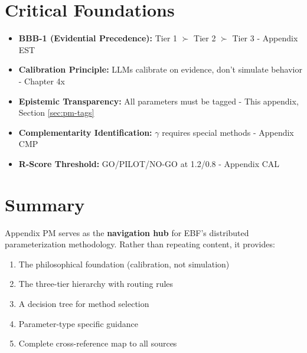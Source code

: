 
\section{Critical Foundations}
\label{sec:pm-foundations}

\begin{itemize}
    \item \textbf{BBB-1 (Evidential Precedence):} Tier 1 $\succ$ Tier 2 $\succ$ Tier 3 - Appendix EST
    \item \textbf{Calibration Principle:} LLMs calibrate on evidence, don't simulate behavior - Chapter 4x
    \item \textbf{Epistemic Transparency:} All parameters must be tagged - This appendix, Section \ref{sec:pm-tags}
    \item \textbf{Complementarity Identification:} $\gamma$ requires special methods - Appendix CMP
    \item \textbf{R-Score Threshold:} GO/PILOT/NO-GO at 1.2/0.8 - Appendix CAL
\end{itemize}


\section{Summary}
\label{sec:pm-summary}

Appendix PM serves as the \textbf{navigation hub} for EBF's distributed parameterization methodology. Rather than repeating content, it provides:

\begin{enumerate}[nosep]
    \item The philosophical foundation (calibration, not simulation)
    \item The three-tier hierarchy with routing rules
    \item A decision tree for method selection
    \item Parameter-type specific guidance
    \item Complete cross-reference map to all sources
\end{enumerate}

